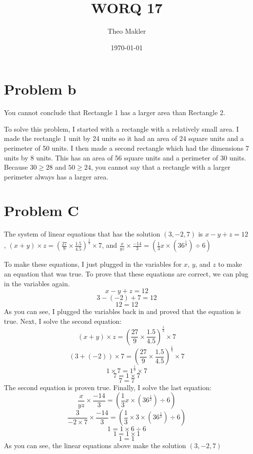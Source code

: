 \documentclass[a4paper]{article}
\title{WORQ 17}
\author{Theo Makler}
\date{\today}
\begin{document}
\maketitle

\section{Problem b}

You cannot conclude that Rectangle 1 has a larger area than Rectangle 2.

To solve this problem, I started with a rectangle with a relatively small area. I made the rectangle 1 unit by 24 units so it had an area of 24 square units and a perimeter of 50 units. I then made a second rectangle which had the dimensions 7 units by 8 units. This has an area of 56 square units and a perimeter of 30 units. Because $30\ge 28$ and $50\ge 24$, you cannot say that a rectangle with a larger perimeter always has a larger area.

\section{Problem C}

The system of linear equations that has the solution $(3,-2,7)$ is $x-y+z=12$, $(x+y)\times z =(\frac{27}{9}\times\frac{1.5}{4.5})^\frac{1}{3}\times7$, and $\frac{x}{yz}\times\frac{-14}{3}=(\frac{1}{3}x \times (36^\frac{1}{2}) \div 6)$

To make these equations, I just plugged in the variables for $x$, $y$, and $z$ to make an equation that was true. To prove that these equations are correct, we can plug in the variables again.
$$x-y+z=12$$
$$3-(-2)+7=12$$
$$12=12$$
As you can see, I plugged the variables back in and proved that the equation is true. Next, I solve the second equation:
$$(x+y)\times z =(\frac{27}{9}\times\frac{1.5}{4.5})^\frac{1}{3}\times7$$
$$(3+(-2))\times 7 =(\frac{27}{9}\times\frac{1.5}{4.5})^\frac{1}{3}\times7$$
$$1\times 7 =1^\frac{1}{3}\times7$$
$$7=1\times7$$
$$7=7$$
The second equation is proven true. Finally, I solve the last equation:
$$\frac{x}{yz}\times\frac{-14}{3}=(\frac{1}{3}x \times (36^\frac{1}{2}) \div 6)$$
$$\frac{3}{-2\times7}\times\frac{-14}{3}=(\frac{1}{3}\times3 \times (36^\frac{1}{2}) \div 6)$$
$$1=1 \times 6 \div 6$$
$$1=1\times1$$
$$1=1$$
As you can see, the linear equations above make the solution $(3,-2,7)$
\end{document}
